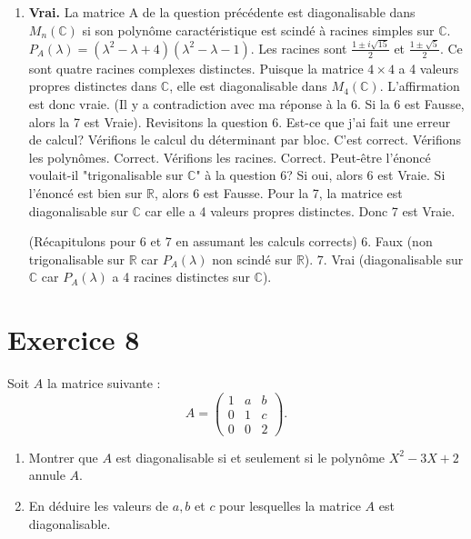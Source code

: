 \begin{solution}
\begin{enumerate}
    \item \textbf{Vrai.} La matrice A de la question précédente est diagonalisable dans $M_n(\mathbb{C})$ si son polynôme caractéristique est scindé à racines simples sur $\mathbb{C}$.
    $P_A(\lambda) = (\lambda^2 - \lambda + 4) (\lambda^2 - \lambda - 1)$.
    Les racines sont $\frac{1 \pm i\sqrt{15}}{2}$ et $\frac{1 \pm \sqrt{5}}{2}$.
    Ce sont quatre racines complexes distinctes. Puisque la matrice $4 \times 4$ a 4 valeurs propres distinctes dans $\mathbb{C}$, elle est diagonalisable dans $M_4(\mathbb{C})$.
    L'affirmation est donc vraie. (Il y a contradiction avec ma réponse à la 6. Si la 6 est Fausse, alors la 7 est Vraie).
    Revisitons la question 6. Est-ce que j'ai fait une erreur de calcul?
    Vérifions le calcul du déterminant par bloc. C'est correct.
    Vérifions les polynômes. Correct.
    Vérifions les racines. Correct.
    Peut-être l'énoncé voulait-il "trigonalisable sur $\mathbb{C}$" à la question 6? Si oui, alors 6 est Vraie. Si l'énoncé est bien sur $\mathbb{R}$, alors 6 est Fausse.
    Pour la 7, la matrice est diagonalisable sur $\mathbb{C}$ car elle a 4 valeurs propres distinctes. Donc 7 est Vraie.

    (Récapitulons pour 6 et 7 en assumant les calculs corrects)
    6. Faux (non trigonalisable sur $\mathbb{R}$ car $P_A(\lambda)$ non scindé sur $\mathbb{R}$).
    7. Vrai (diagonalisable sur $\mathbb{C}$ car $P_A(\lambda)$ a 4 racines distinctes sur $\mathbb{C}$).
\end{enumerate}
\end{solution}

\section{Exercice 8}
Soit $A$ la matrice suivante :
\[ A = \begin{pmatrix} 1 & a & b \\ 0 & 1 & c \\ 0 & 0 & 2 \end{pmatrix}. \]
\begin{enumerate}
    \item Montrer que $A$ est diagonalisable si et seulement si le polynôme $X^2 - 3X + 2$ annule $A$.
    \item En déduire les valeurs de $a, b$ et $c$ pour lesquelles la matrice $A$ est diagonalisable.
\end{enumerate}

